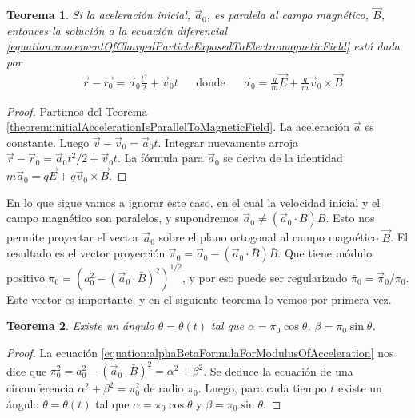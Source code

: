 \documentclass{article}
\newtheorem{theorem}{Teorema}
\begin{document}
  \begin{theorem}
    Si la aceleración inicial, \(\vec{a}_0\), es paralela al campo magnético, \(\vec{B}\), entonces la solución a la ecuación diferencial \eqref{equation:movementOfChargedParticleExposedToElectromagneticField}
    está dada por
    \begin{align}
      &\vec{r} - \vec{r_0}
      =
      \vec{a}_0 \frac{t^2}{2} + \vec{v}_0 t
      && \text{donde}
      && \vec{a}_0 = \frac{q}{m} \vec{E} + \frac{q}{m} \vec{v}_0 \times \vec{B}
    \end{align}
  \end{theorem}
  \begin{proof}
    Partimos del Teorema \ref{theorem:initialAccelerationIsParallelToMagneticField}.
    La aceleración \(\vec{a}\) es constante.
    Luego \(\vec{v} - \vec{v}_0 = \vec{a}_0 t\).
    Integrar nuevamente arroja \(\vec{r} - \vec{r}_0 = \vec{a}_0 t^2 / 2 + \vec{v}_0 t\).
    La fórmula para \(\vec{a}_0\) se deriva de la identidad \(m \vec{a}_0 = q \vec{E} + q \vec{v}_0 \times \vec{B}\).
  \end{proof}

  En lo que sigue vamos a ignorar este caso, en el cual la velocidad inicial y el campo magnético son paralelos, y supondremos \(\vec{a}_0 \neq (\vec{a}_0 \cdot \bar{B}) \bar{B}\).
  Esto nos permite proyectar el vector \(\vec{a}_0\) sobre el plano ortogonal al campo magnético \(\vec{B}\).
  El resultado es el vector proyección \(\vec{\pi}_0 = \vec{a}_0 - (\vec{a}_0 \cdot \bar{B}) \bar{B}\).
  Que tiene módulo positivo \(\pi_0 = (a_0^2 - (\vec{a}_0 \cdot \bar{B})^2)^{1 / 2}\), y por eso puede ser regularizado \(\bar{\pi}_0 = \vec{\pi}_0 / \pi_0\).
  Este vector es importante, y en el siguiente teorema lo vemos por primera vez.

  \begin{theorem}
    \label{theorem:alphaBetaDescribeCircularMotion}
    Existe un ángulo \(\theta = \theta(t)\) tal que \(\alpha = \pi_0 \cos \theta\), \(\beta = \pi_0 \sin \theta\).
  \end{theorem}
  \begin{proof}
    La ecuación \eqref{equation:alphaBetaFormulaForModulusOfAcceleration} nos dice que \(\pi_0^2 = a_0^2 - (\vec{a}_0 \cdot \bar{B})^2 = \alpha^2 + \beta^2\).
    Se deduce la ecuación de una circunferencia \(\alpha^2 + \beta^2 = \pi_0^2\) de radio \(\pi_0\).
    Luego, para cada tiempo \(t\) existe un ángulo \(\theta = \theta(t)\) tal que \(\alpha = \pi_0 \cos \theta\) y \(\beta = \pi_0 \sin \theta\).
  \end{proof}
\end{document}
